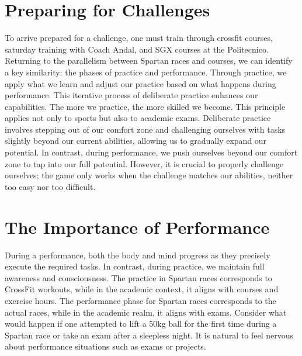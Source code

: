 \documentclass[12pt,oneside,a4paper]{article}
\begin{document}
\section{Preparing for Challenges} \label{sec:prep}
To arrive prepared for a challenge, one must train through crossfit courses, saturday training with Coach Andal, and SGX courses at the Politecnico. Returning to the parallelism between Spartan races and courses, we can identify a key similarity: the phases of practice and performance. Through practice, we apply what we learn and adjust our practice based on what happens during performance. This iterative process of deliberate practice enhances our capabilities. The more we practice, the more skilled we become. 
This principle applies not only to sports but also to academic exams. Deliberate practice involves stepping out of our comfort zone and challenging ourselves with tasks slightly beyond our current abilities, allowing us to gradually expand our potential. In contrast, during performance, we push ourselves beyond our comfort zone to tap into our full potential. However, it is crucial to properly challenge ourselves; the game only works when the challenge matches our abilities, neither too easy nor too difficult.

\section{The Importance of Performance} \label{sec:imp}
During a performance, both the body and mind progress as they precisely execute the required tasks. In contrast, during practice, we maintain full awareness and consciousness. 
The practice in Spartan races corresponds to CrossFit workouts, while in the academic context, it aligns with courses and exercise hours. The performance phase for Spartan races corresponds to the actual races, while in the academic realm, it aligns with exams. Consider what would happen if one attempted to lift a 50kg ball for the first time during a Spartan race or take an exam after a sleepless night. It is natural to feel nervous about performance situations such as exams or projects.
\end{document}
